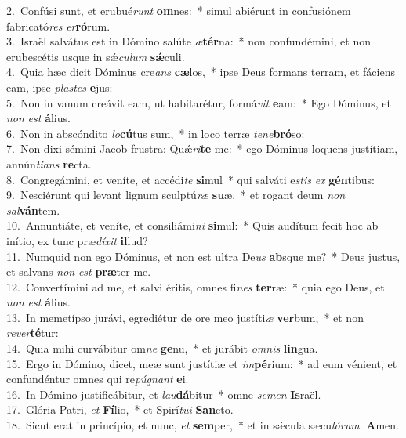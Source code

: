 {2.~}Confúsi sunt, et erubué\textit{runt} \textbf{om}nes:~* simul abiérunt in confusiónem fabricató\textit{res} \textit{er}\textbf{ró}rum.\\
{3.~}Israël salvátus est in Dómino salúte \textit{æ}\textbf{tér}na:~* non confundémini, et non erubescétis usque in sǽ\textit{cu}\textit{lum} \textbf{sǽ}culi.\\
{4.~}Quia hæc dicit Dóminus cre\textit{ans} \textbf{cæ}los,~* ipse Deus formans terram, et fáciens eam, ipse \textit{pla}\textit{stes} \textbf{e}jus:\\
{5.~}Non in vanum creávit eam, ut habitarétur, formá\textit{vit} \textbf{e}am:~* Ego Dóminus, et \textit{non} \textit{est} \textbf{á}lius.\\
{6.~}Non in abscóndito \textit{lo}\textbf{cú}tus sum,~* in loco terræ \textit{te}\textit{ne}\textbf{bró}so:\\
{7.~}Non dixi sémini Jacob frustra: Quǽ\textit{ri}\textbf{te} me:~* ego Dóminus loquens justítiam, annún\textit{ti}\textit{ans} \textbf{re}cta.\\
{8.~}Congregámini, et veníte, et accédi\textit{te} \textbf{si}mul~* qui salváti e\textit{stis} \textit{ex} \textbf{gén}tibus:\\
{9.~}Nesciérunt qui levant lignum sculptú\textit{ræ} \textbf{su}æ,~* et rogant deum \textit{non} \textit{sal}\textbf{ván}tem.\\
{10.~}Annuntiáte, et veníte, et consiliámi\textit{ni} \textbf{si}mul:~* Quis audítum fecit hoc ab inítio, ex tunc præ\textit{dí}\textit{xit} \textbf{il}lud?\\
{11.~}Numquid non ego Dóminus, et non est ultra De\textit{us} \textbf{ab}sque me?~* Deus justus, et salvans \textit{non} \textit{est} \textbf{præ}ter me.\\
{12.~}Convertímini ad me, et salvi éritis, omnes fi\textit{nes} \textbf{ter}ræ:~* quia ego Deus, et \textit{non} \textit{est} \textbf{á}lius.\\
{13.~}In memetípso jurávi, egrediétur de ore meo justíti\textit{æ} \textbf{ver}bum,~* et non \textit{re}\textit{ver}\textbf{té}tur:\\
{14.~}Quia mihi curvábitur om\textit{ne} \textbf{ge}nu,~* et jurábit \textit{om}\textit{nis} \textbf{lin}gua.\\
{15.~}Ergo in Dómino, dicet, meæ sunt justítiæ et \textit{im}\textbf{pé}rium:~* ad eum vénient, et confundéntur omnes qui re\textit{pú}\textit{gnant} \textbf{e}i.\\
{16.~}In Dómino justificábitur, et \textit{lau}\textbf{dá}bitur~* omne \textit{se}\textit{men} \textbf{Is}raël.\\
{17.~}Glória Patri, \textit{et} \textbf{Fí}lio,~* et Spirí\textit{tu}\textit{i} \textbf{San}cto.\\
{18.~}Sicut erat in princípio, et nunc, \textit{et} \textbf{sem}per,~* et in sǽcula sæcu\textit{ló}\textit{rum}. \textbf{A}men.\\
